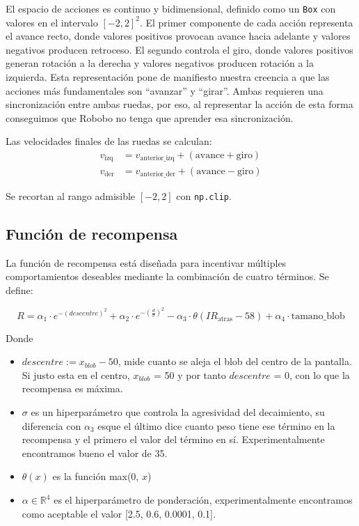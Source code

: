 \documentclass[12pt,a4paper]{article}
\begin{document}
El espacio de acciones es continuo y bidimensional, definido como un
\texttt{Box} con valores en el intervalo $[-2, 2]^2$. El primer componente de
cada acción representa el avance recto, donde valores positivos provocan avance
hacia adelante y valores negativos producen retroceso. El segundo
controla el giro, donde valores positivos generan rotación a la derecha y
valores negativos producen rotación a la izquierda. Esta representación pone de manifiesto nuestra creencia a que las acciones más fundamentales son ``avanzar'' y ``girar''. Ambas requieren una sincronización entre ambas ruedas, por eso, al representar la acción de esta forma conseguimos que Robobo no tenga que aprender esa sincronización. 

Las velocidades finales de las ruedas se calculan:
\begin{align}
v_{\text{izq}} &= v_{\text{anterior\_izq}} + (\text{avance} + \text{giro}) \\
v_{\text{der}} &= v_{\text{anterior\_der}} + (\text{avance} - \text{giro})
\end{align}

Se recortan al rango admisible $[-2, 2]$ con \texttt{np.clip}.

\subsection{Función de recompensa}

La función de recompensa está diseñada para incentivar múltiples comportamientos
deseables mediante la combinación de cuatro términos. Se define:

\begin{equation}
R = \alpha_1 \cdot e^{-(descentre)^2} + \alpha_2 \cdot e^{-\left(\frac{d}{\sigma}\right)^2} - \alpha_3 \cdot \theta(IR_{\text{atras}} - 58) + \alpha_4 \cdot \text{tamano\_blob}
\end{equation}

Donde
\begin{itemize}
	\item $descentre := x_{blob} - 50$, mide cuanto se aleja el blob del centro de la pantalla. Si justo esta en el centro, $x_{blob}$ = 50 y por tanto $descentre$ = 0, con lo que la recompensa es máxima.
	\item $\sigma$ es un hiperparámetro que controla la agresividad del decaimiento, su diferencia con $\alpha_3$ esque el último dice cuanto peso tiene ese término en la recompensa y el primero el valor del término en sí. Experimentalmente encontramos bueno el valor de 35.
	\item $\theta(x)$ es la función max(0, $x$)
	\item $\alpha \in \mathbb{R}^4$ es el hiperparámetro de ponderación, experimentalmente encontramos como aceptable el valor [2.5, 0.6, 0.0001, 0.1].
\end{itemize}
\end{document}

